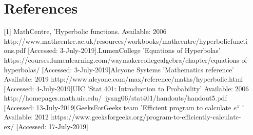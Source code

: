 \documentclass{article}
\begin{document}
\section{References}
[1] MathCentre, 'Hyperbolic functions. Available: 2006 http://www.mathcentre.ac.uk/resources/workbooks/mathcentre/hyperbolicfunctions.pdf [Accessed: 3-July-2019].\linebreak[4]
[2] LumenCollege 'Equations of Hyperbolas' https://courses.lumenlearning.com/waymakercollegealgebra/chapter/equations-of-hyperbolas/ [Accessed: 3-July-2019]\linebreak[4]
[3] Alcyone Systems 'Mathematics reference' Available: 2019 http://www.alcyone.com/max/reference/maths/hyperbolic.html [Accessed: 4-July-2019]\linebreak[4]
[4] UIC 'Stat 401: Introduction to Probability' Available: 2006 http://homepages.math.uic.edu/~jyang06/stat401/handouts/handout5.pdf [Accessed: 13-July-2019]\linebreak[4]
[5] GeeksForGeeks team	 'Efficient program to calculate $e^x$ ' Available: 2012 https://www.geeksforgeeks.org/program-to-efficiently-calculate-ex/ [Accessed: 17-July-2019]\linebreak[4]
\end{document}
